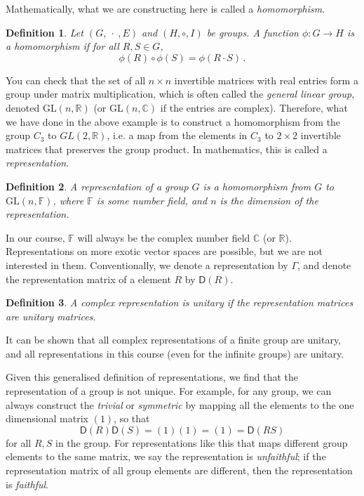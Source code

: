 \documentclass{article}
\theoremstyle{plain}\theoremheaderfont{\normalfont\itshape}\theorembodyfont{\rmfamily}\theoremseparator{.}\newtheorem*{rem}{Remark}\newtheorem*{ex}{Example}\newtheorem*{proof}{Proof}\newtheorem*{altp}{Alternative proof}
\theoremstyle{plain}\theoremheaderfont{\normalfont\bfseries}\theorembodyfont{\rmfamily}\theoremseparator{.}\newtheorem{thm}{Theorem}[section]\newtheorem{lem}[thm]{Lemma}\newtheorem{prop}[thm]{Proposition}\newtheorem*{cor}{Corollary}\newtheorem{defn}[thm]{Definition}\newtheorem{clm}[thm]{Claim}\newtheorem{clminproof}{Claim}\newtheorem*{law}{Law}\newtheorem{pos}[thm]{Postulate}
\theoremstyle{break}\theoremheaderfont{\normalfont\itshape}\theorembodyfont{\rmfamily}\theoremseparator{.\medskip}\newtheorem*{proofskip}{Proof}\newtheorem*{exs}{Examples}\newtheorem*{rems}{Remarks}
\theoremstyle{break}\theoremheaderfont{\normalfont\bfseries}\theorembodyfont{\rmfamily}\theoremseparator{.\medskip}\newtheorem{lemskip}[thm]{Lemma}\newtheorem{defnskip}[thm]{Definition}\newtheorem{propskip}[thm]{Proposition}\newtheorem{thmskip}[thm]{Theorem}
\numberwithin{equation}{section}
\newcommand{\RR}{\mathbb{R}}
\newcommand{\CC}{\mathbb{C}}
\newcommand{\DD}{\mathsf{D}}
\newcommand{\GL}{\mathrm{GL}}
\begin{document}
    Mathematically, what we are constructing here is called a \textit{homomorphism}.
    \begin{defn}
        Let \((G,\ \cdot\ ,E)\) and \((H,\circ,I)\) be groups. A function \(\phi:G\to H\) is a \textit{homomorphism} if for all \(R,S\in G\),
        \begin{equation}
            \phi(R)\circ\phi(S)=\phi(R\cdot S)\,.
        \end{equation}
    \end{defn}
    You can check that the set of all \(n\times n\) invertible matrices with real entries form a group under matrix multiplication, which is often called the \textit{general linear group}, denoted \(\GL(n,\RR)\) (or \(\GL(n,\CC)\) if the entries are complex). Therefore, what we have done in the above example is to construct a homomorphism from the group \(C_3\) to \(GL(2,\RR)\), i.e. a map from the elements in \(C_3\) to \(2\times 2\) invertible matrices that preserves the group product. In mathematics, this is called a \textit{representation}.

    \begin{defn}
        A \textit{representation} of a group \(G\) is a homomorphism from \(G\) to \(\GL(n,\mathbb{F})\), where \(\mathbb{F}\) is some number field, and \(n\) is the \textit{dimension} of the representation.
    \end{defn}
    In our course, \(\mathbb{F}\) will always be the complex number field \(\CC\) (or \(\RR\)). Representations on more exotic vector spaces are possible, but we are not interested in them. Conventionally, we denote a representation by \(\Gamma\), and denote the representation matrix of a element \(R\) by \(\DD(R)\).
    \begin{defn}
        A complex representation is \textit{unitary} if the representation matrices are unitary matrices.
    \end{defn}
    It can be shown that all complex representations of a finite group are unitary, and all representations in this course (even for the infinite groups) are unitary.

    Given this generalised definition of representations, we find that the representation of a group is not unique. For example, for any group, we can always construct the \textit{trivial} or \textit{symmetric} by mapping all the elements to the one dimensional matrix \((1)\), so that
    \begin{equation}
        \DD(R)\DD(S)=(1)(1)=(1)=\DD(RS)
    \end{equation}
    for all \(R,S\) in the group. For representations like this that maps different group elements to the same matrix, we say the representation is \textit{unfaithful}; if the representation matrix of all group elements are different, then the representation is \textit{faithful}.
\end{document}
